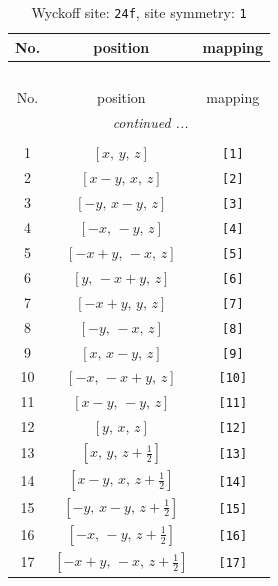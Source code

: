 \documentclass[fleqn,8pt]{jsarticle}
\begin{document}
\begin{longtable}{ccc}
\caption{Wyckoff site: {\tt 24f}, site symmetry: {\tt 1}}
 \\
 \hline \hline
No. & position & mapping \\ \hline \endfirsthead

\multicolumn{2}{l}{\tablename\ \thetable{}} \\
 \hline \hline
No. & position & mapping \\ \hline \endhead

 \hline \hline
\multicolumn{2}{r}{\footnotesize\it continued ...} \\ \endfoot

 \hline \hline
\multicolumn{2}{r}{} \\ \endlastfoot

1 & $\left[ x,\, y,\, z \right]$ & {\tt [1]} \\ \hline
2 & $\left[ x - y,\, x,\, z \right]$ & {\tt [2]} \\ \hline
3 & $\left[ - y,\, x - y,\, z \right]$ & {\tt [3]} \\ \hline
4 & $\left[ - x,\, - y,\, z \right]$ & {\tt [4]} \\ \hline
5 & $\left[ - x + y,\, - x,\, z \right]$ & {\tt [5]} \\ \hline
6 & $\left[ y,\, - x + y,\, z \right]$ & {\tt [6]} \\ \hline
7 & $\left[ - x + y,\, y,\, z \right]$ & {\tt [7]} \\ \hline
8 & $\left[ - y,\, - x,\, z \right]$ & {\tt [8]} \\ \hline
9 & $\left[ x,\, x - y,\, z \right]$ & {\tt [9]} \\ \hline
10 & $\left[ - x,\, - x + y,\, z \right]$ & {\tt [10]} \\ \hline
11 & $\left[ x - y,\, - y,\, z \right]$ & {\tt [11]} \\ \hline
12 & $\left[ y,\, x,\, z \right]$ & {\tt [12]} \\ \hline
13 & $\left[ x,\, y,\, z + \frac{1}{2} \right]$ & {\tt [13]} \\ \hline
14 & $\left[ x - y,\, x,\, z + \frac{1}{2} \right]$ & {\tt [14]} \\ \hline
15 & $\left[ - y,\, x - y,\, z + \frac{1}{2} \right]$ & {\tt [15]} \\ \hline
16 & $\left[ - x,\, - y,\, z + \frac{1}{2} \right]$ & {\tt [16]} \\ \hline
17 & $\left[ - x + y,\, - x,\, z + \frac{1}{2} \right]$ & {\tt [17]} \\ \hline

\end{longtable}
\end{document}
